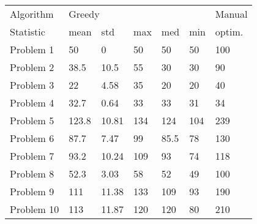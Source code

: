 \begin{tabular}{lllllll}
\toprule
Algorithm & \multicolumn{5}{l}{Greedy} & Manual \\
Statistic &   mean &    std &  max &   med &  min & optim. \\
\midrule
Problem 1  &     50 &      0 &   50 &    50 &   50 &    100 \\
Problem 2  &   38.5 &   10.5 &   55 &    30 &   30 &     90 \\
Problem 3  &     22 &   4.58 &   35 &    20 &   20 &     40 \\
Problem 4  &   32.7 &   0.64 &   33 &    33 &   31 &     34 \\
Problem 5  &  123.8 &  10.81 &  134 &   124 &  104 &    239 \\
Problem 6  &   87.7 &   7.47 &   99 &  85.5 &   78 &    130 \\
Problem 7  &   93.2 &  10.24 &  109 &    93 &   74 &    118 \\
Problem 8  &   52.3 &   3.03 &   58 &    52 &   49 &    100 \\
Problem 9  &    111 &  11.38 &  133 &   109 &   93 &    190 \\
Problem 10 &    113 &  11.87 &  120 &   120 &   80 &    210 \\
\bottomrule
\end{tabular}
